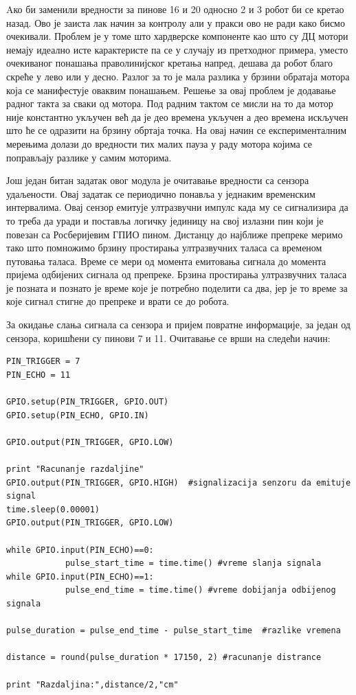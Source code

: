 \documentclass[12pt,oneside]{memoir}
\theoremstyle{remark}
\begin{document}
Aко би заменили вредности за пинове 16 и 20 односно 2 и 3 робот би се кретао назад. Ово је заиста лак начин за контролу али у пракси ово не ради како бисмо очекивали. Проблем је у томе што хардверске компоненте као што су ДЦ мотори немају идеално исте карактеристе па се у случају из претходног примера, уместо очекиваног понашања праволинијског кретања напред, дешава да робот благо скреће у лево или у десно. Разлог за то је мала разлика у брзини обратаја мотора која се манифестује оваквим понашањем. Решење за овај проблем је додавање радног такта за сваки од мотора. Под радним тактом се мисли на то да мотор није константно укључен већ да је део времена укључен а део времена искључен што ће се одразити на брзину обртаја точка. На овај начин се експерименталним мерењима долази до вредности тих малих пауза у раду мотора којима се поправљају разлике у самим моторима.

Још један битан задатак овог модула је очитавање вредности са сензора удаљености. Овај задатак се периодично понавља у једнаким временским интервалима. 
Овај сензор емитује ултразвучни импулс када му се сигнализира да то треба да уради и поставља логичку јединицу на свој излазни пин који је повезан са Росберијевим ГПИО пином. Дистанцу до најближе препреке меримо тако што помножимо брзину простирања ултразвучних таласа са временом путовања таласа. Време се мери од момента емитовања сигнала до момента пријема одбијених сигнала од препреке. Брзина простирања ултразвучних таласа је позната и познато је време које је потребно поделити са два, јер је то време за које сигнал стигне до препреке и врати се до робота.

За окидање слања сигнала са сензора и пријем повратне информације, за један од сензора, коришћени су пинови 7 и 11. Очитавање се врши на следећи начин:
\begin{lstlisting}
PIN_TRIGGER = 7
PIN_ECHO = 11

GPIO.setup(PIN_TRIGGER, GPIO.OUT)
GPIO.setup(PIN_ECHO, GPIO.IN)

GPIO.output(PIN_TRIGGER, GPIO.LOW)

print "Racunanje razdaljine"
GPIO.output(PIN_TRIGGER, GPIO.HIGH)  #signalizacija senzoru da emituje signal
time.sleep(0.00001)
GPIO.output(PIN_TRIGGER, GPIO.LOW)

while GPIO.input(PIN_ECHO)==0:
            pulse_start_time = time.time() #vreme slanja signala
while GPIO.input(PIN_ECHO)==1:
            pulse_end_time = time.time() #vreme dobijanja odbijenog signala

pulse_duration = pulse_end_time - pulse_start_time  #razlike vremena

distance = round(pulse_duration * 17150, 2) #racunanje distrance

print "Razdaljina:",distance/2,"cm"
\end{lstlisting}
\end{document}
